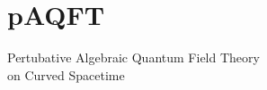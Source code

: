 \documentclass[9pt]{beamer}
\begin{document}
\section{pAQFT}

{%
%
% 
%
%
%
%
\begin{frame}%
\bf
\vspace*{30pt}
%
\begin{exampleblock}{\vspace*{-3ex}}%
%
\begin{center}%
%
\Large Pertubative Algebraic Quantum Field Theory \\[10pt] on Curved Spacetime
%
\end{center}%
%
\end{exampleblock}%
%
\end{frame}
%
}%

\end{document}

